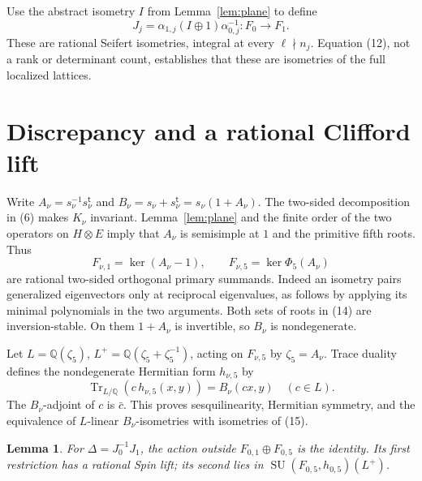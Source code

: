 \documentclass[11pt]{article}
\newtheorem{lemma}[theorem]{Lemma}
\newcommand{\Q}{\mathbb Q}
\newcommand{\Tr}{\operatorname{Tr}}
\newcommand{\SU}{\operatorname{SU}}
\begin{document}
Use the abstract isometry \(I\) from Lemma~\ref{lem:plane} to define
\[
 J_j=\alpha_{1,j}(I\oplus1)\alpha_{0,j}^{-1}:F_0\longrightarrow F_1.
                                                               \tag{13}
\]
These are rational Seifert isometries, integral at every
\(\ell\nmid n_j\). Equation (12), not a rank or determinant count,
establishes that these are isometries of the full localized lattices.

\section{Discrepancy and a rational Clifford lift}

Write \(A_\nu=s_\nu^{-1}s_\nu^{\mathsf t}\) and
\(B_\nu=s_\nu+s_\nu^{\mathsf t}=s_\nu(1+A_\nu)\).
The two-sided decomposition in (6) makes \(K_\nu\) invariant.
Lemma~\ref{lem:plane} and the finite order of the two operators on
\(H\otimes E\) imply that \(A_\nu\) is semisimple at \(1\) and
the primitive fifth roots. Thus
\[
 F_{\nu,1}=\ker(A_\nu-1),\qquad
 F_{\nu,5}=\ker\Phi_5(A_\nu)
                                                               \tag{14}
\]
are rational two-sided orthogonal primary summands.
Indeed an isometry pairs generalized eigenvectors only at reciprocal
eigenvalues, as follows by applying its minimal polynomials in the
two arguments. Both sets of roots in (14) are inversion-stable.
On them \(1+A_\nu\) is invertible, so \(B_\nu\) is nondegenerate.

Let \(L=\Q(\zeta_5)\), \(L^+=\Q(\zeta_5+\zeta_5^{-1})\), acting
on \(F_{\nu,5}\) by \(\zeta_5=A_\nu\). Trace duality defines
the nondegenerate Hermitian form \(h_{\nu,5}\) by
\[
 \Tr_{L/\Q}(c\,h_{\nu,5}(x,y))=B_\nu(cx,y)\quad(c\in L).          \tag{15}
\]
The \(B_\nu\)-adjoint of \(c\) is \(\bar c\). This proves
sesquilinearity, Hermitian symmetry, and the equivalence of
\(L\)-linear \(B_\nu\)-isometries with isometries of (15).

\begin{lemma}\label{lem:lift}
For \(\Delta=J_0^{-1}J_1\), the action outside
\(F_{0,1}\oplus F_{0,5}\) is the identity.
Its first restriction has a rational Spin lift; its second lies
in \(\SU(F_{0,5},h_{0,5})(L^+)\).
\end{lemma}
\end{document}
